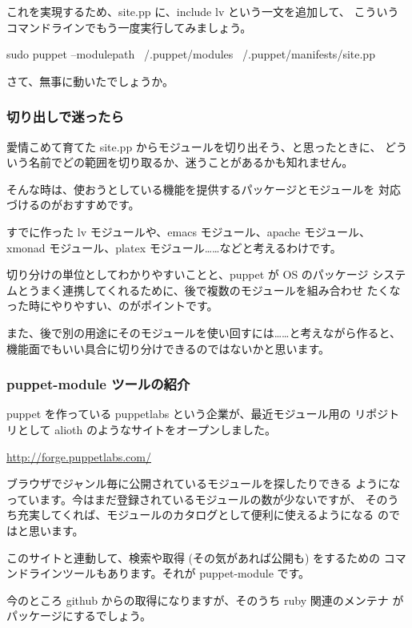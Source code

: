 \documentclass[mingoth,a4paper]{jsarticle}
\begin{document}
これを実現するため、site.pp に、include lv という一文を追加して、
こういうコマンドラインでもう一度実行してみましょう。

\begin{commandline}
sudo puppet --modulepath ~/.puppet/modules ~/.puppet/manifests/site.pp
\end{commandline}

さて、無事に動いたでしょうか。

\subsubsection{切り出しで迷ったら}

愛情こめて育てた site.pp からモジュールを切り出そう、と思ったときに、
どういう名前でどの範囲を切り取るか、迷うことがあるかも知れません。

そんな時は、使おうとしている機能を提供するパッケージとモジュールを
対応づけるのがおすすめです。

すでに作った lv モジュールや、emacs モジュール、apache モジュール、
xmonad モジュール、platex モジュール……などと考えるわけです。

切り分けの単位としてわかりやすいことと、puppet が OS のパッケージ
システムとうまく連携してくれるために、後で複数のモジュールを組み合わせ
たくなった時にやりやすい、のがポイントです。

また、後で別の用途にそのモジュールを使い回すには……と考えながら作ると、
機能面でもいい具合に切り分けできるのではないかと思います。

\subsubsection{puppet-module ツールの紹介}

puppet を作っている puppetlabs という企業が、最近モジュール用の
リポジトリとして alioth のようなサイトをオープンしました。

\url{http://forge.puppetlabs.com/}

ブラウザでジャンル毎に公開されているモジュールを探したりできる
ようになっています。今はまだ登録されているモジュールの数が少ないですが、
そのうち充実してくれば、モジュールのカタログとして便利に使えるようになる
のではと思います。

このサイトと連動して、検索や取得 (その気があれば公開も) をするための
コマンドラインツールもあります。それが puppet-module です。

今のところ github からの取得になりますが、そのうち ruby 関連のメンテナ
がパッケージにするでしょう。
\end{document}
